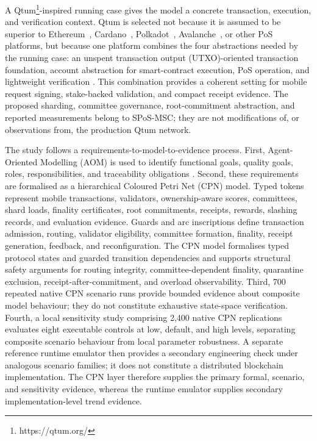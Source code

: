 \documentclass[a4paper,fleqn]{cas-sc}
\begin{document}
A Qtum\footnote{https://qtum.org/}-inspired running case gives the model a concrete transaction,
execution, and verification context. Qtum is selected not because it is assumed to be superior to Ethereum~\cite{ROSABILBAO2023Ethereum}, Cardano~\cite{Niya2023Cardano}, Polkadot~\cite{Abbas2022Polkadot}, Avalanche~\cite{Tanana2019Avalanche}, or other PoS platforms, but because one platform combines the four abstractions needed by the running case: an unspent transaction output (UTXO)-oriented transaction foundation, account abstraction for smart-contract execution, PoS operation, and lightweight verification \cite{Chen2020,dai2017smart}. This combination provides a
coherent setting for mobile request signing, stake-backed validation, and compact receipt evidence. The proposed sharding, committee governance, root-commitment abstraction, and reported measurements belong to SPoS-MSC; they are not modifications of, or observations from, the production Qtum network.

The study follows a requirements-to-model-to-evidence process. First,
Agent-Oriented Modelling (AOM) is used to identify functional goals, quality goals, roles, responsibilities, and traceability obligations
\cite{Sterling2009,yu2002}. Second, these requirements are formalised as a hierarchical Coloured Petri Net (CPN) model. Typed tokens represent mobile transactions, validators, ownership-aware scores, committees, shard loads, finality certificates, root commitments, receipts, rewards, slashing records, and evaluation evidence. Guards and arc inscriptions define transaction admission, routing, validator eligibility, committee formation, finality, receipt generation, feedback, and reconfiguration. The CPN model formalises typed protocol states and guarded transition dependencies and supports structural safety arguments for routing integrity, committee-dependent finality, quarantine exclusion, receipt-after-commitment, and overload observability. Third, 700 repeated native CPN scenario runs provide bounded evidence about composite model behaviour; they do not constitute exhaustive state-space verification. Fourth, a local sensitivity study comprising 2,400 native CPN replications evaluates eight executable controls at low, default, and high levels, separating composite scenario behaviour from local parameter robustness. A separate reference runtime emulator then provides a secondary engineering check under analogous scenario families; it does not constitute a distributed blockchain implementation. The CPN layer therefore supplies the primary formal, scenario, and sensitivity evidence, whereas the runtime emulator supplies secondary implementation-level trend evidence.
\end{document}
